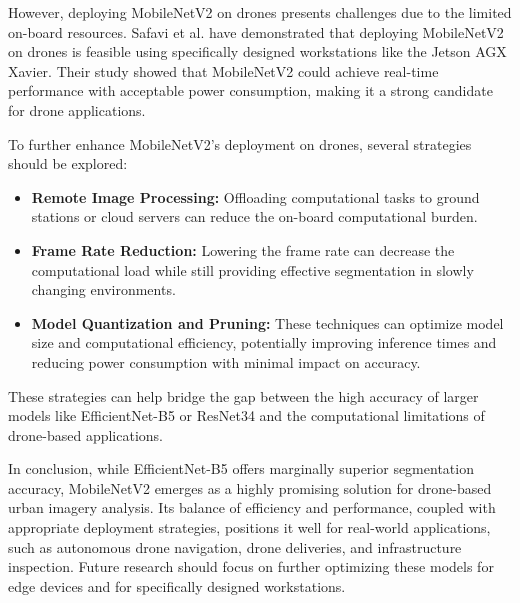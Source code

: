 \documentclass[a4paper]{article}
\begin{document}
However, deploying MobileNetV2 on drones presents challenges due to the limited on-board resources. Safavi et al. \cite{safavi2023efficientsemanticsegmentationedge} have demonstrated that deploying MobileNetV2 on drones is feasible using specifically designed workstations like the Jetson AGX Xavier. Their study showed that MobileNetV2 could achieve real-time performance with acceptable power consumption, making it a strong candidate for drone applications. 

To further enhance MobileNetV2's deployment on drones, several strategies should be explored:

\begin{itemize}
    \item \textbf{Remote Image Processing:} Offloading computational tasks to ground stations or cloud servers can reduce the on-board computational burden.
    \item \textbf{Frame Rate Reduction:} Lowering the frame rate can decrease the computational load while still providing effective segmentation in slowly changing environments.
    \item \textbf{Model Quantization and Pruning:} These techniques can optimize model size and computational efficiency, potentially improving inference times and reducing power consumption with minimal impact on accuracy.
\end{itemize}

These strategies can help bridge the gap between the high accuracy of larger models like EfficientNet-B5 or ResNet34 and the computational limitations of drone-based applications.

In conclusion, while EfficientNet-B5 offers marginally superior segmentation accuracy, MobileNetV2 emerges as a highly promising solution for drone-based urban imagery analysis. Its balance of efficiency and performance, coupled with appropriate deployment strategies, positions it well for real-world applications, such as autonomous drone navigation, drone deliveries, and infrastructure inspection. Future research should focus on further optimizing these models for edge devices and for specifically designed workstations.


\end{document}
